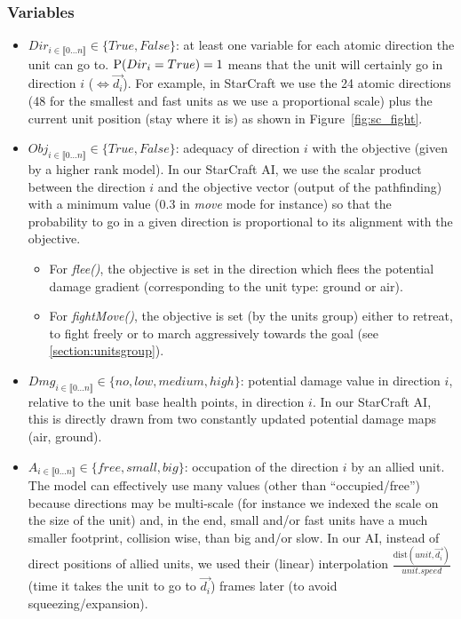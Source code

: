 \subsubsection{Variables}
\begin{itemize}
\item $Dir_{i \in \llbracket 0 \dots n\rrbracket } \in \{True, False\}$: at least one variable for each atomic direction the unit can go to. $\mathrm{P}(Dir_i = True) = 1$ means that the unit will certainly go in direction $i$ ($\Leftrightarrow \vec{d_i}$). For example, in StarCraft we use the 24 atomic directions (48 for the smallest and fast units as we use a proportional scale) plus the current unit position (stay where it is) as shown in Figure~\ref{fig:sc_fight}. %

\item $Obj_{i \in \llbracket 0 \dots n\rrbracket } \in \{True, False\}$: adequacy of direction $i$ with the objective (given by a higher rank model). In our StarCraft AI, we use the scalar product between the direction $i$ and the objective vector (output of the pathfinding) with a minimum value ($0.3$ in \textit{move} mode for instance) so that the probability to go in a given direction is proportional to its alignment with the objective.
\begin{itemize}
    \item For \textit{flee()}, the objective is set in the direction which flees the potential damage gradient (corresponding to the unit type: ground or air).
    \item For \textit{fightMove()}, the objective is set (by the units group) either to retreat, to fight freely or to march aggressively towards the goal (see \ref{section:unitsgroup}).
\end{itemize}

\item $Dmg_{i \in \llbracket 0 \dots n\rrbracket } \in \{no, low, medium, high\}$: potential damage value in direction $i$, relative to the unit base health points, in direction $i$. In our StarCraft AI, this is directly drawn from two constantly updated potential damage maps (air, ground). %

\item $A_{i \in \llbracket 0 \dots n\rrbracket } \in \{free, small, big\}$: occupation of the direction $i$ by an allied unit. The model can effectively use many values (other than ``occupied/free'') because directions may be multi-scale (for instance we indexed the scale on the size of the unit) and, in the end, small and/or fast units have a much smaller footprint, collision wise, than big and/or slow. In our AI, instead of direct positions of allied units, we used their (linear) interpolation $\frac{\mathrm{dist}(unit, \vec{d_i})}{unit.speed}$ (time it takes the unit to go to $\vec{d_i}$) 
frames later (to avoid squeezing/expansion).


\end{itemize}
